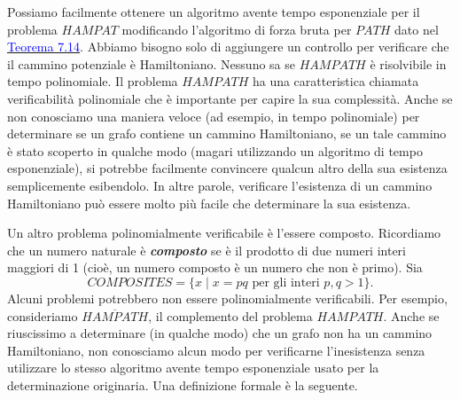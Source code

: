 \documentclass{article}
\begin{document}
Possiamo facilmente ottenere un algoritmo avente tempo esponenziale per il problema $HAMPAT$ modificando l'algoritmo di forza bruta per $PATH$ dato nel \hyperref[teorema-7.14]{\textcolor{blue}{Teorema 7.14}}. 
Abbiamo bisogno solo di aggiungere un controllo per verificare che il cammino potenziale è Hamiltoniano. 
Nessuno sa se $HAMPATH$ è risolvibile in tempo polinomiale.
Il problema $HAMPATH$ ha una caratteristica chiamata verificabilità polinomiale che è importante per capire la sua complessità. 
Anche se non conosciamo una maniera veloce (ad esempio, in tempo polinomiale) per determinare se un grafo contiene un cammino Hamiltoniano, se un tale cammino è stato scoperto in qualche modo (magari utilizzando un algoritmo di tempo esponenziale), si potrebbe facilmente convincere qualcun altro della sua esistenza semplicemente esibendolo. 
In altre parole, verificare l'esistenza di un cammino Hamiltoniano può essere molto più facile che determinare la sua esistenza.

Un altro problema polinomialmente verificabile è l'essere composto. 
Ricordiamo che un numero naturale è \textit{\textbf{composto}} se è il prodotto di due numeri interi maggiori di 1 (cioè, un numero composto è un numero che non è primo).
Sia
$$
COMPOSITES = \{ x \mid x = pq \text{ per gli interi } p,q > 1\}.
$$
Alcuni problemi potrebbero non essere polinomialmente verificabili.
Per esempio, consideriamo $\overline{HAMPATH}$, il complemento del problema $HAMPATH$. 
Anche se riuscissimo a determinare (in qualche modo) che un grafo non ha un cammino Hamiltoniano, non conosciamo alcun modo per verificarne l'inesistenza senza utilizzare lo stesso algoritmo avente tempo esponenziale usato per la determinazione originaria. 
Una definizione formale è la seguente.
\end{document}
